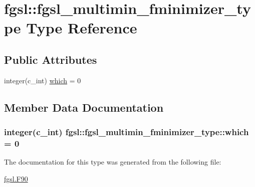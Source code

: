 \hypertarget{structfgsl_1_1fgsl__multimin__fminimizer__type}{}\section{fgsl\+:\+:fgsl\+\_\+multimin\+\_\+fminimizer\+\_\+type Type Reference}
\label{structfgsl_1_1fgsl__multimin__fminimizer__type}
\subsection*{Public Attributes}
\begin{DoxyCompactItemize}
\item 
integer(c\+\_\+int) \hyperlink{structfgsl_1_1fgsl__multimin__fminimizer__type_ab348d09ad4f289b76865f4f43fdfd02d}{which} = 0
\end{DoxyCompactItemize}


\subsection{Member Data Documentation}
\hypertarget{structfgsl_1_1fgsl__multimin__fminimizer__type_ab348d09ad4f289b76865f4f43fdfd02d}{}
\subsubsection[{which}]{\setlength{\rightskip}{0pt plus 5cm}integer(c\+\_\+int) fgsl\+::fgsl\+\_\+multimin\+\_\+fminimizer\+\_\+type\+::which = 0}\label{structfgsl_1_1fgsl__multimin__fminimizer__type_ab348d09ad4f289b76865f4f43fdfd02d}


The documentation for this type was generated from the following file\+:\begin{DoxyCompactItemize}
\item 
\hyperlink{fgsl_8F90}{fgsl.\+F90}\end{DoxyCompactItemize}
